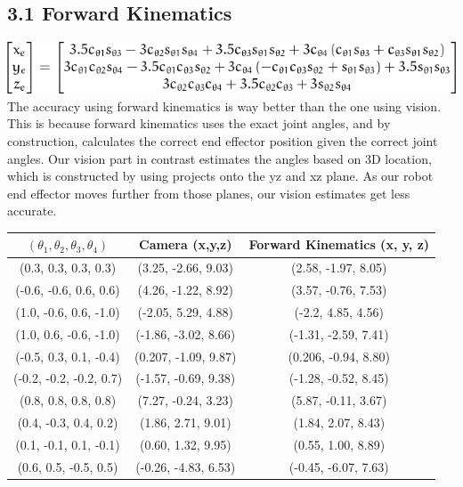 

\subsection{3.1 Forward Kinematics}

\includegraphics[]{x_y_z.png} \\

The accuracy using forward kinematics is way better than the one using vision. This is because forward kinematics uses the exact joint angles, and by construction, calculates the correct end effector position given the correct joint angles. Our vision part in contrast estimates the angles based on 3D location, which is constructed by using projects onto the yz and xz plane. As our robot end effector moves further from those planes, our vision estimates get less accurate.
\begin{center}
\begin{tabular}{|c|c|c|}
\hline
$(\theta_1 , \theta_2 , \theta_3, \theta_4)$ & Camera (x,y,z) & Forward Kinematics (x, y, z) \\\hline
 (0.3, 0.3, 0.3, 0.3) & (3.25, -2.66, 9.03) & (2.58, -1.97, 8.05) \\ \hline
 (-0.6, -0.6, 0.6, 0.6) & (4.26, -1.22, 8.92) & (3.57, -0.76, 7.53) \\ \hline
 (1.0, -0.6, 0.6, -1.0) & (-2.05, 5.29, 4.88) & (-2.2, 4.85, 4.56) \\ \hline
 (1.0, 0.6, -0.6, -1.0) & (-1.86, -3.02, 8.66) & (-1.31, -2.59, 7.41) \\ \hline
 (-0.5, 0.3, 0.1, -0.4) & (0.207, -1.09, 9.87) & (0.206, -0.94, 8.80) \\ \hline
 (-0.2, -0.2, -0.2, 0.7) & (-1.57, -0.69, 9.38) & (-1.28, -0.52, 8.45) \\ \hline
 (0.8, 0.8, 0.8, 0.8) & (7.27, -0.24, 3.23) & (5.87, -0.11, 3.67) \\ \hline
 (0.4, -0.3, 0.4, 0.2) & (1.86, 2.71, 9.01) & (1.84, 2.07, 8.43) \\ \hline
 (0.1, -0.1, 0.1, -0.1) & (0.60, 1.32, 9.95) & (0.55, 1.00, 8.89) \\ \hline
 (0.6, 0.5, -0.5, 0.5) & (-0.26, -4.83, 6.53) & (-0.45, -6.07, 7.63) \\ \hline
\end{tabular}
\end{center}
